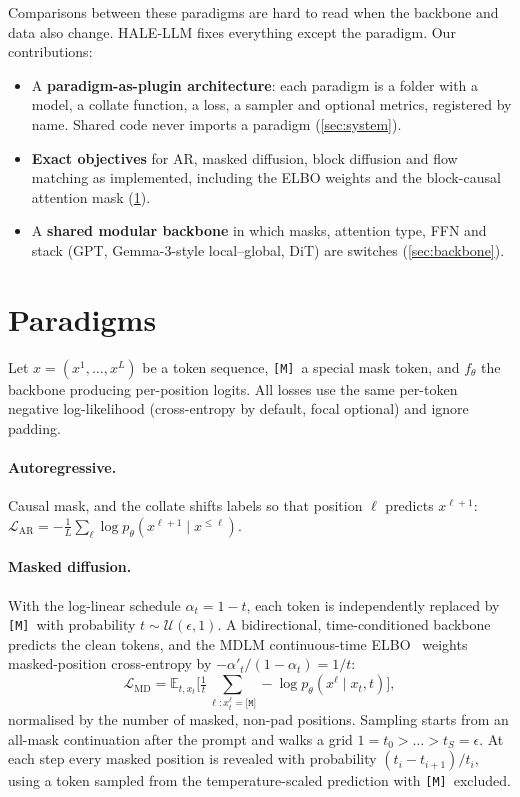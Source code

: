 \documentclass[11pt]{article}
\newcommand{\M}{\texttt{[M]}}
\begin{document}
Comparisons between these paradigms are hard to read when the backbone and data also change.
HALE-LLM fixes everything except the paradigm. Our contributions:
\begin{itemize}
  \item A \textbf{paradigm-as-plugin architecture}: each paradigm is a folder with a model, a
        collate function, a loss, a sampler and optional metrics, registered by name. Shared
        code never imports a paradigm (\cref{sec:system}).
  \item \textbf{Exact objectives} for AR, masked diffusion, block diffusion and flow matching
        as implemented, including the ELBO weights and the block-causal attention mask
        (\cref{sec:objectives}).
  \item A \textbf{shared modular backbone} in which masks, attention type, FFN and stack
        (GPT, Gemma-3-style local--global, DiT) are switches (\cref{sec:backbone}).
\end{itemize}

\section{Paradigms}
\label{sec:objectives}

Let $x=(x^1,\dots,x^L)$ be a token sequence, \M\ a special mask token, and
$f_\theta$ the backbone producing per-position logits. All losses use the same per-token
negative log-likelihood (cross-entropy by default, focal optional) and ignore padding.

\paragraph{Autoregressive.} Causal mask, and the collate shifts labels so that position $\ell$
predicts $x^{\ell+1}$: $\mathcal L_{\text{AR}} = -\frac1L\sum_\ell \log p_\theta(x^{\ell+1}\mid x^{\le \ell})$.

\paragraph{Masked diffusion.} With the log-linear schedule $\alpha_t=1-t$, each token is
independently replaced by \M\ with probability $t\sim\mathcal U(\epsilon,1)$. A bidirectional,
time-conditioned backbone predicts the clean tokens, and the MDLM continuous-time
ELBO~\cite{sahoo2024mdlm,shi2024md4} weights masked-position cross-entropy by
$-\alpha'_t/(1-\alpha_t)=1/t$:
\begin{equation}
  \mathcal L_{\text{MD}} = \mathbb E_{t,x_t}\Big[\tfrac1t \textstyle\sum_{\ell: x_t^\ell=\M} -\log p_\theta(x^\ell\mid x_t, t)\Big],
\end{equation}
normalised by the number of masked, non-pad positions. Sampling starts from an all-mask
continuation after the prompt and walks a grid $1=t_0>\dots>t_S=\epsilon$. At each step
every masked position is revealed with probability $(t_i-t_{i+1})/t_i$, using a token sampled
from the temperature-scaled prediction with \M\ excluded.
\end{document}
